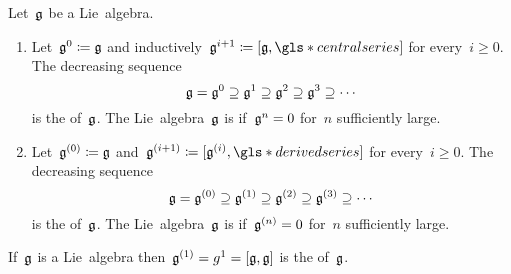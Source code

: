 \begin{definition}
  Let~$\mathfrak{g}$ be a Lie~algebra.
  \begin{enumerate}
    \item
      Let~$\mathfrak{g}^0 \coloneqq \mathfrak{g}$ and inductively~$\glie^{i+1} \defined [\glie, \gls*{central series}]$ for every~$i \geq 0$.
      The decreasing sequence
      \[
        \mathfrak{g}
        =
        \mathfrak{g}^0
        \supseteq
        \mathfrak{g}^1
        \supseteq
        \mathfrak{g}^2
        \supseteq
        \mathfrak{g}^3
        \supseteq
        \dotsb
      \]
      is the  of~$\mathfrak{g}$.
      The Lie~algebra~$\mathfrak{g}$ is  if~$\mathfrak{g}^n = 0$ for~$n$ sufficiently large.
    \item
      Let~$\mathfrak{g}^{(0)} \coloneqq \mathfrak{g}$ and~$\glie^{(i+1)} \defined [\glie^{(i)}, \gls*{derived series}]$ for every~$i \geq 0$.
      The decreasing sequence
      \[
        \mathfrak{g}
        =
        \mathfrak{g}^{(0)}
        \supseteq
        \mathfrak{g}^{(1)}
        \supseteq
        \mathfrak{g}^{(2)}
        \supseteq
        \mathfrak{g}^{(3)}
        \supseteq
        \dotsb
      \]
      is the  of~$\mathfrak{g}$.
      The Lie~algebra~$\mathfrak{g}$ is  if~$\mathfrak{g}^{(n)} = 0$ for~$n$ sufficiently large.
  \end{enumerate}
\end{definition}


\begin{definition}
  If~$\mathfrak{g}$ is a Lie~algebra then~$\mathfrak{g}^{(1)} = g^1 = [\mathfrak{g}, \mathfrak{g}]$ is the  of~$\mathfrak{g}$.
\end{definition}


